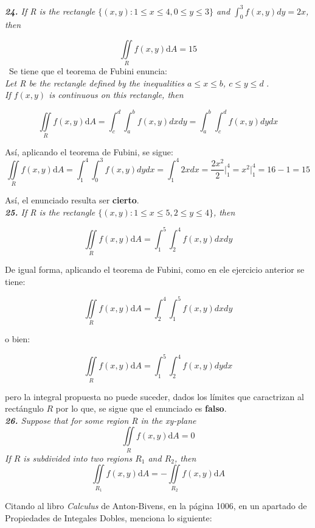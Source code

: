 \documentclass[a4paper,12pt]{article}
\begin{document}
	\textit{\textbf{24.} If R is the rectangle $ \{(x,y):1 \leq x \leq 4,0 \leq y \leq 3\} $
			and $\int_{0}^{3} f(x,y) dy = 2x$, then}

		$$ \iint\limits_{R} f(x,y)\mathrm{d}A = 15 $$
	\
	Se tiene que el teorema de Fubini enuncia:\\
	\textit{ Let R be the rectangle defined by the inequalities $a \leq x \leq b$, $c \leq y \leq d$ }.\\
	\textit{ If $f(x, y)$ is continuous on this rectangle, then }

		$$ \iint\limits_{R} f(x,y)\mathrm{d}A = \int_{c}^{d} \int_{a}^{b} f(x,y) dx dy
			= \int_{a}^{b} \int_{c}^{d} f(x,y) dy dx  $$

	Así, aplicando el teorema de Fubini, se sigue:
		$$ \iint\limits_{R} f(x,y)\mathrm{d}A = \int_{1}^{4} \int_{0}^{3} f(x,y) dy dx
		 	= \int_{1}^{4} 2x dx = \frac{2x^2}{2} \Big|_1^4 = x^2 \Big|_1^4 = 16 - 1 = 15 $$

		Así, el enunciado resulta ser \textbf{cierto}.\\

	\textit{\textbf{25.} If R is the rectangle $ \{(x,y):1 \leq x \leq 5,2 \leq y \leq 4\} $,
			then}

		$$ \iint\limits_{R} f(x,y)\mathrm{d}A = \int_{1}^{5} \int_{2}^{4} f(x,y) dx dy $$

	De igual forma, aplicando el teorema de Fubini, como en ele ejercicio anterior se tiene:

		$$ \iint\limits_{R} f(x,y)\mathrm{d}A = \int_{2}^{4} \int_{1}^{5} f(x,y) dx dy $$

			o bien:

		$$ \iint\limits_{R} f(x,y)\mathrm{d}A = \int_{1}^{5} \int_{2}^{4} f(x,y) dy dx $$

	pero la integral propuesta no puede suceder, dados los límites que caractrizan
	al rectángulo $R$ por lo que, se sigue que el enunciado es \textbf{falso}.\\

	\textit{\textbf{26.} Suppose that for some region R in the xy-plane}
			$$ \iint\limits_{R} f(x,y)\mathrm{d}A = 0 $$
	\textit{ If $R$ is subdivided into two regions $R_1$ and $R_2$, then }
			$$ \iint\limits_{R_1} f(x,y)\mathrm{d}A = - \iint\limits_{R_2} f(x,y)\mathrm{d}A  $$

	Citando al libro \textit{Calculus} de Anton-Bivens, en la página 1006, en un
	apartado de Propiedades de Integales Dobles, menciona lo siguiente:\\
\end{document}
